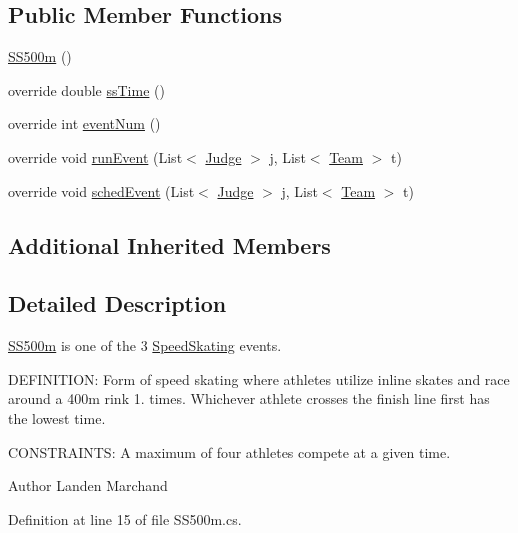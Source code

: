\subsection*{Public Member Functions}
\begin{DoxyCompactItemize}
\item 
\hyperlink{classPCO_1_1SS500m_a052125293177cecfa650435ac5decb38}{S\+S500m} ()
\item 
override double \hyperlink{classPCO_1_1SS500m_a57b859e56912c44aee51ac2854f5ce9c}{ss\+Time} ()
\item 
override int \hyperlink{classPCO_1_1SS500m_a909b7bee200b907aae35d8bc47d442e5}{event\+Num} ()
\item 
override void \hyperlink{classPCO_1_1SS500m_a3ebc360a0ec5c60e1d2c66511c8f8025}{run\+Event} (List$<$ \hyperlink{classPCO_1_1Judge}{Judge} $>$ j, List$<$ \hyperlink{classPCO_1_1Team}{Team} $>$ t)
\item 
override void \hyperlink{classPCO_1_1SS500m_a760bbe2b60121e4fe86c64f2c8b60848}{sched\+Event} (List$<$ \hyperlink{classPCO_1_1Judge}{Judge} $>$ j, List$<$ \hyperlink{classPCO_1_1Team}{Team} $>$ t)
\end{DoxyCompactItemize}
\subsection*{Additional Inherited Members}


\subsection{Detailed Description}
\hyperlink{classPCO_1_1SS500m}{S\+S500m} is one of the 3 \hyperlink{classPCO_1_1SpeedSkating}{Speed\+Skating} events. 

D\+E\+F\+I\+N\+I\+T\+I\+O\+N\+: Form of speed skating where athletes utilize inline skates and race around a 400m rink 1. times. Whichever athlete crosses the finish line first has the lowest time.

C\+O\+N\+S\+T\+R\+A\+I\+N\+T\+S\+: A maximum of four athletes compete at a given time.\begin{DoxyAuthor}{Author}
Landen Marchand 
\end{DoxyAuthor}


Definition at line 15 of file S\+S500m.\+cs.




